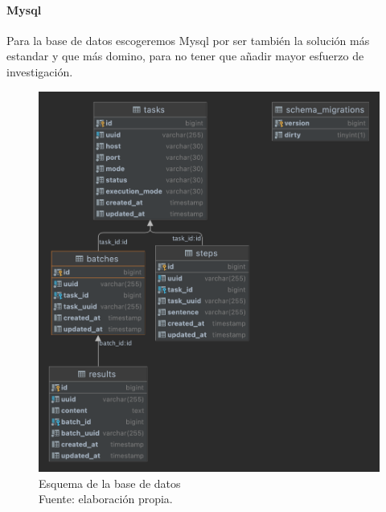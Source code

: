 \paragraph{Mysql}\label{par:mysql}
    Para la base de datos escogeremos Mysql por ser también la solución más estandar y que más domino, para no tener que añadir mayor esfuerzo de investigación.
    \begin{figure}[H]
        \centering
        \includegraphics[scale = 0.15]{part/Proyecto_ejecutivo/memoria_constructiva/dbSchema}
        \caption{Esquema de la base de datos \\ Fuente: elaboración propia.}\label{fig:dbSchema}
    \end{figure}
